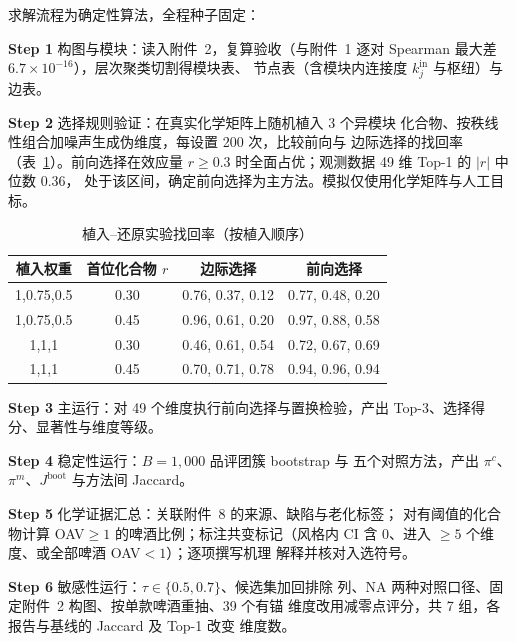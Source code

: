 \documentclass[12pt,a4paper]{article}
\begin{document}
求解流程为确定性算法，全程种子固定：

\textbf{Step 1} 构图与模块：读入附件~2，复算验收（与附件~1 逐对
Spearman 最大差 $6.7\times10^{-16}$），层次聚类切割得模块表、
节点表（含模块内连接度 $k^{\mathrm{in}}_j$ 与枢纽）与边表。

\textbf{Step 2} 选择规则验证：在真实化学矩阵上随机植入 3 个异模块
化合物、按秩线性组合加噪声生成伪维度，每设置 200 次，比较前向与
边际选择的找回率（表~\ref{tab:recovery}）。前向选择在效应量
$r\ge0.3$ 时全面占优；观测数据 49 维 Top-1 的 $|r|$ 中位数 0.36，
处于该区间，确定前向选择为主方法。模拟仅使用化学矩阵与人工目标。

\begin{table}[!htbp]
  \centering\small
  \caption{植入--还原实验找回率（按植入顺序）}
  \label{tab:recovery}
  \begin{tabular}{cccc}
  \toprule
   植入权重 & 首位化合物 $r$ & 边际选择 & 前向选择 \\
   \midrule
    1,0.75,0.5 & 0.30 & 0.76, 0.37, 0.12 & 0.77, 0.48, 0.20 \\
    1,0.75,0.5 & 0.45 & 0.96, 0.61, 0.20 & 0.97, 0.88, 0.58 \\
    1,1,1 & 0.30 & 0.46, 0.61, 0.54 & 0.72, 0.67, 0.69 \\
    1,1,1 & 0.45 & 0.70, 0.71, 0.78 & 0.94, 0.96, 0.94 \\
    \bottomrule
  \end{tabular}
\end{table}


\textbf{Step 3} 主运行：对 49 个维度执行前向选择与置换检验，产出
Top-3、选择得分、显著性与维度等级。

\textbf{Step 4} 稳定性运行：$B=1{,}000$ 品评团簇 bootstrap 与
五个对照方法，产出 $\pi^c$、$\pi^m$、$J^{\mathrm{boot}}$ 与方法间
Jaccard。

\textbf{Step 5} 化学证据汇总：关联附件~8 的来源、缺陷与老化标签；
对有阈值的化合物计算 OAV$\ge1$ 的啤酒比例；标注共变标记（风格内
CI 含 0、进入 $\ge5$ 个维度、或全部啤酒 OAV$<1$）；逐项撰写机理
解释并核对入选符号。

\textbf{Step 6} 敏感性运行：$\tau\in\{0.5,0.7\}$、候选集加回排除
列、NA 两种对照口径、固定附件~2 构图、按单款啤酒重抽、39 个有锚
维度改用减零点评分，共 7 组，各报告与基线的 Jaccard 及 Top-1 改变
维度数。
\end{document}
